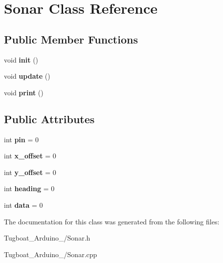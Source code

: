 \hypertarget{class_sonar}{}\section{Sonar Class Reference}
\label{class_sonar}
\subsection*{Public Member Functions}
\begin{DoxyCompactItemize}
\item 
void {\bfseries init} ()\hypertarget{class_sonar_a36e4843ba4365a03dc6cefd7e95fc40c}{}\label{class_sonar_a36e4843ba4365a03dc6cefd7e95fc40c}

\item 
void {\bfseries update} ()\hypertarget{class_sonar_aaf10dd734528b86b4dea3ab35c4ee4f4}{}\label{class_sonar_aaf10dd734528b86b4dea3ab35c4ee4f4}

\item 
void {\bfseries print} ()\hypertarget{class_sonar_a0615d57159979557108ba4251f2cc3ba}{}\label{class_sonar_a0615d57159979557108ba4251f2cc3ba}

\end{DoxyCompactItemize}
\subsection*{Public Attributes}
\begin{DoxyCompactItemize}
\item 
int {\bfseries pin} = 0\hypertarget{class_sonar_a9ed75965a959ae26da37935c6ba54cd8}{}\label{class_sonar_a9ed75965a959ae26da37935c6ba54cd8}

\item 
int {\bfseries x\+\_\+offset} = 0\hypertarget{class_sonar_a70b68fce08f081df7f3224785f6c19c3}{}\label{class_sonar_a70b68fce08f081df7f3224785f6c19c3}

\item 
int {\bfseries y\+\_\+offset} = 0\hypertarget{class_sonar_a295645ef4f2e9d5c190200fb3be1a663}{}\label{class_sonar_a295645ef4f2e9d5c190200fb3be1a663}

\item 
int {\bfseries heading} = 0\hypertarget{class_sonar_adfc1e85142b0c0d63a2a85127fb0e769}{}\label{class_sonar_adfc1e85142b0c0d63a2a85127fb0e769}

\item 
int {\bfseries data} = 0\hypertarget{class_sonar_a733d092a86b636d1f8b00262b6b7aed4}{}\label{class_sonar_a733d092a86b636d1f8b00262b6b7aed4}

\end{DoxyCompactItemize}


The documentation for this class was generated from the following files\+:\begin{DoxyCompactItemize}
\item 
Tugboat\+\_\+\+Arduino\+\_/Sonar.\+h\item 
Tugboat\+\_\+\+Arduino\+\_/Sonar.\+cpp\end{DoxyCompactItemize}
